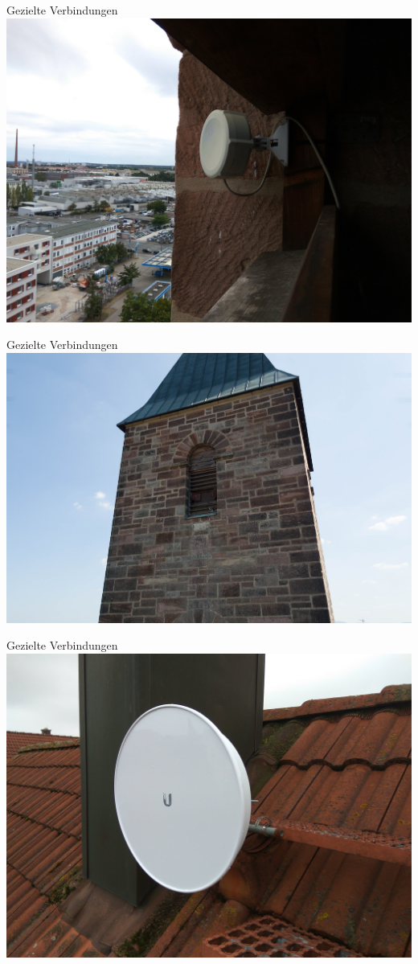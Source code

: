 \documentclass{beamer}
\begin{document}
	\begin{frame}[standout]{Gezielte Verbindungen}
		\includegraphics[width=\framewidth]{media/p2p-sxt.jpg}
	\end{frame}
	\begin{frame}[standout]{Gezielte Verbindungen}
		\includegraphics[width=\framewidth]{media/p2p-stmarkus.jpg}
	\end{frame}
	\begin{frame}[standout]{Gezielte Verbindungen}
		\includegraphics[width=\framewidth]{media/p2p-wohnhaus.jpg}
	\end{frame}
\end{document}
